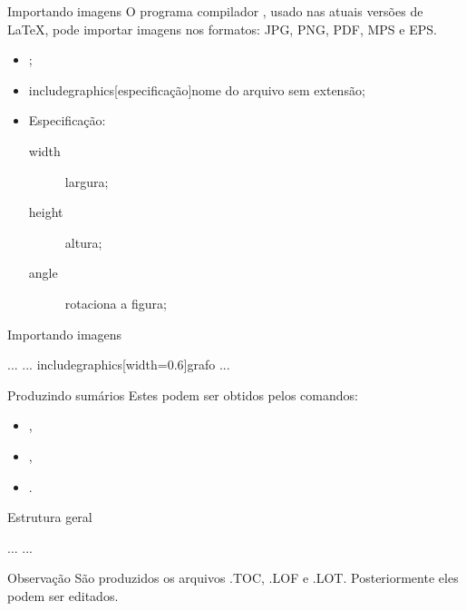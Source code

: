 \begin{frame}{Importando imagens}
O programa compilador , usado nas atuais versões de \LaTeX{}, pode importar imagens nos formatos: JPG, PNG, PDF, MPS e EPS.

\begin{itemize}
\item {};
\item \LOA includegraphics[especificação]{nome do arquivo sem extensão};
\item[] Especificação:
\begin{description}
\item [width] largura;
\item [height] altura;
\item [angle] rotaciona a figura;
\end{description}
\end{itemize}
\end{frame}

\begin{frame}{Importando imagens}
\begin{LaTeXcode}[Exemplo]
\n
...\n
{}\n
{}\n
...\n
{}\n
{}\n
\LOA includegraphics[width=0.6]{grafo}\n
{}\n
{}\n
...\n
{}
\end{LaTeXcode}
\end{frame}

\begin{frame}{Produzindo sumários}
Estes podem ser obtidos pelos comandos: 
\begin{itemize}
\item {},
\item {}, 
\item {}.
\end{itemize}
\end{frame}

\begin{frame}{Estrutura geral}
\begin{LaTeXcode}
\n
...\n
{}\n
{}\n
{}\n
{}\n
{}\n
{}\n
...\n
{}
\end{LaTeXcode}

\begin{block}{Observação}
São produzidos os arquivos .TOC, .LOF e .LOT. Posteriormente eles podem ser editados.
\end{block}
\end{frame}

